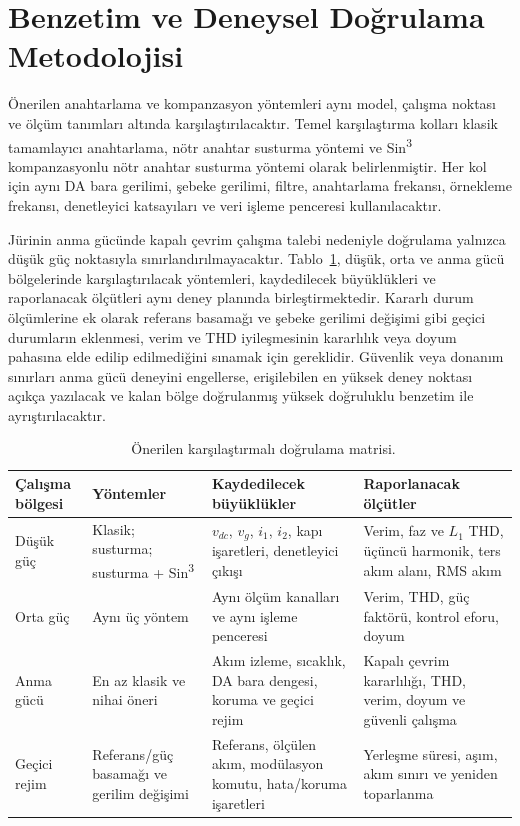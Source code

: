 \section{Benzetim ve Deneysel Doğrulama Metodolojisi}

Önerilen anahtarlama ve kompanzasyon yöntemleri aynı model, çalışma noktası ve ölçüm tanımları altında karşılaştırılacaktır. Temel karşılaştırma kolları klasik tamamlayıcı anahtarlama, nötr anahtar susturma yöntemi ve Sin\textsuperscript{3} kompanzasyonlu nötr anahtar susturma yöntemi olarak belirlenmiştir. Her kol için aynı DA bara gerilimi, şebeke gerilimi, filtre, anahtarlama frekansı, örnekleme frekansı, denetleyici katsayıları ve veri işleme penceresi kullanılacaktır.

Jürinin anma gücünde kapalı çevrim çalışma talebi nedeniyle doğrulama yalnızca düşük güç noktasıyla sınırlandırılmayacaktır. Tablo~\ref{tab:dogrulama-matrisi}, düşük, orta ve anma gücü bölgelerinde karşılaştırılacak yöntemleri, kaydedilecek büyüklükleri ve raporlanacak ölçütleri aynı deney planında birleştirmektedir. Kararlı durum ölçümlerine ek olarak referans basamağı ve şebeke gerilimi değişimi gibi geçici durumların eklenmesi, verim ve THD iyileşmesinin kararlılık veya doyum pahasına elde edilip edilmediğini sınamak için gereklidir. Güvenlik veya donanım sınırları anma gücü deneyini engellerse, erişilebilen en yüksek deney noktası açıkça yazılacak ve kalan bölge doğrulanmış yüksek doğruluklu benzetim ile ayrıştırılacaktır.

\begin{table}[htbp]
  \centering
  \caption{\juriistegietiketi\ Önerilen karşılaştırmalı doğrulama matrisi.}
  \label{tab:dogrulama-matrisi}
  \small
  \begin{tabularx}{\textwidth}{p{} p{} X X}
    \toprule
    Çalışma bölgesi & Yöntemler & Kaydedilecek büyüklükler & Raporlanacak ölçütler \\
    \midrule
    Düşük güç & Klasik; susturma; susturma + Sin\textsuperscript{3} & $v_{dc}$, $v_g$, $i_1$, $i_2$, kapı işaretleri, denetleyici çıkışı & Verim, faz ve $L_1$ THD, üçüncü harmonik, ters akım alanı, RMS akım \\
    Orta güç & Aynı üç yöntem & Aynı ölçüm kanalları ve aynı işleme penceresi & Verim, THD, güç faktörü, kontrol eforu, doyum \\
    Anma gücü & En az klasik ve nihai öneri & Akım izleme, sıcaklık, DA bara dengesi, koruma ve geçici rejim & Kapalı çevrim kararlılığı, THD, verim, doyum ve güvenli çalışma \\
    Geçici rejim & Referans/güç basamağı ve gerilim değişimi & Referans, ölçülen akım, modülasyon komutu, hata/koruma işaretleri & Yerleşme süresi, aşım, akım sınırı ve yeniden toparlanma \\
    \bottomrule
  \end{tabularx}
\end{table}

